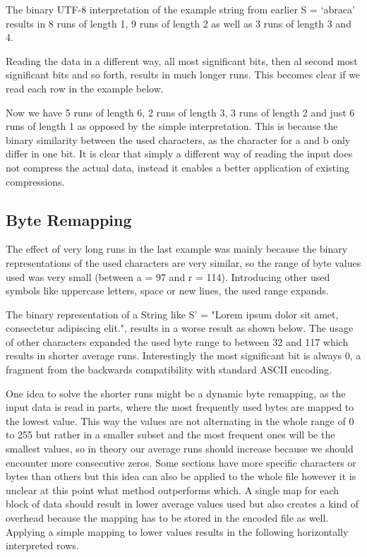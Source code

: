 \par{
The binary UTF-8 interpretation of the example string from earlier S = ‘abraca’ results in 8 runs of length 1, 9 runs of length 2 as well as 3 runs of length 3 and 4.  
\scalardump\dataA

Reading the data in a different way, all most significant bits, then al second most significant bits and so forth, results in much longer runs. This becomes clear if we read each row in the example below. 
\arraydump\dataA

Now we have 5 runs of length 6, 2 runs of length 3, 3 runs of length 2 and just 6 runs of length 1 as opposed by the simple interpretation. This is because the binary similarity between the used characters, as the character for a and b only differ in one bit. It is clear that simply a different way of reading the input does not compress the actual data, instead it enables a better application of existing compressions. 
}

\subsection{Byte Remapping}
\label{ch:Analysis:sec:Improvements by Preprocessing:subSec:byteRemapping}
\par{
The effect of very long runs in the last example was mainly because the binary representations of the used characters are very similar, so the range of byte values used was very small (between a = 97 and r = 114). Introducing other used symbols like uppercase letters, space or new lines, the used range expands.
}

\par{
The binary representation of a String like S' = "Lorem ipsum dolor sit amet, consectetur adipiscing elit.", results in a worse result as shown below. 
The usage of other characters expanded the used byte range to between 32 and 117 which results in shorter average runs. Interestingly the most significant bit is always 0, a fragment from the backwards compatibility with standard ASCII encoding.

\arraydump\dataB
}

\par{
One idea to solve the shorter runs might be a dynamic byte remapping, as the input data is read in parts, where the most frequently used bytes are mapped to the lowest value. This way the values are not alternating in the whole range of 0 to 255 but rather in a smaller subset and the most frequent ones will be the smallest values, so in theory our average runs should increase because we should encounter more consecutive zeros. Some sections have more specific characters or bytes than others but this idea can also be applied to the whole file however it is unclear at this point what method outperforms which. A single map for each block of data should result in lower average values used but also creates a kind of overhead because the mapping has to be stored in the encoded file as well. Applying a simple mapping to lower values results in the following horizontally interpreted rows.
}

